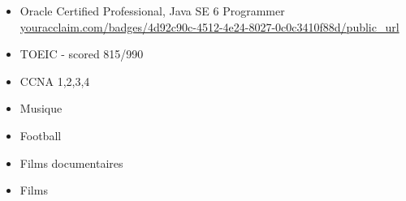 \begin{itemize}
\item Oracle Certified Professional, Java SE 6 Programmer \url{youracclaim.com/badges/4d92c90c-4512-4e24-8027-0c0c3410f88d/public_url} 
\item TOEIC - scored 815/990
\item CCNA 1,2,3,4
\end{itemize}








\begin{itemize}
\item Musique 
\item Football
\item Films documentaires
\item Films
\end{itemize}
